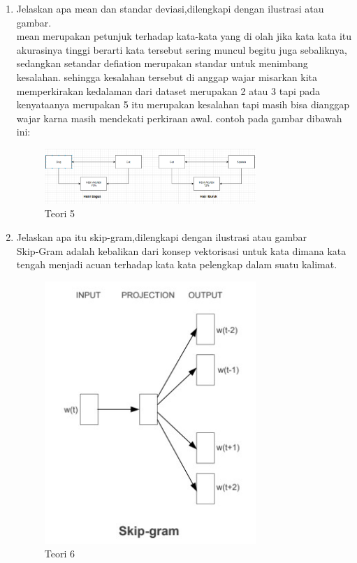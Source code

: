 \begin{enumerate}
\item Jelaskan apa mean dan standar deviasi,dilengkapi dengan ilustrasi atau gambar.
	\hfill\\
mean merupakan petunjuk terhadap kata-kata yang di olah jika kata kata itu akurasinya tinggi berarti kata tersebut sering muncul begitu juga sebaliknya, sedangkan setandar defiation merupakan standar untuk menimbang kesalahan. sehingga kesalahan tersebut di anggap wajar misarkan kita memperkirakan kedalaman dari dataset merupakan 2 atau 3 tapi pada kenyataanya merupakan 5 itu merupakan kesalahan tapi masih bisa dianggap wajar karna masih mendekati perkiraan awal.
contoh pada gambar dibawah ini:
\begin{figure}[H]
    \includegraphics[width=8cm]{figures/1174084/5/teori5.png}
    \centering
    \caption{Teori 5}
\end{figure}

\item Jelaskan apa itu skip-gram,dilengkapi dengan ilustrasi atau gambar
	\hfill\\
	Skip-Gram adalah kebalikan dari konsep vektorisasi untuk kata dimana kata tengah menjadi acuan terhadap kata kata pelengkap dalam suatu kalimat.
\begin{figure}[H]
    \includegraphics[width=8cm]{figures/1174084/5/teori6.png}
    \centering
    \caption{Teori 6}
\end{figure}
\end{enumerate}


